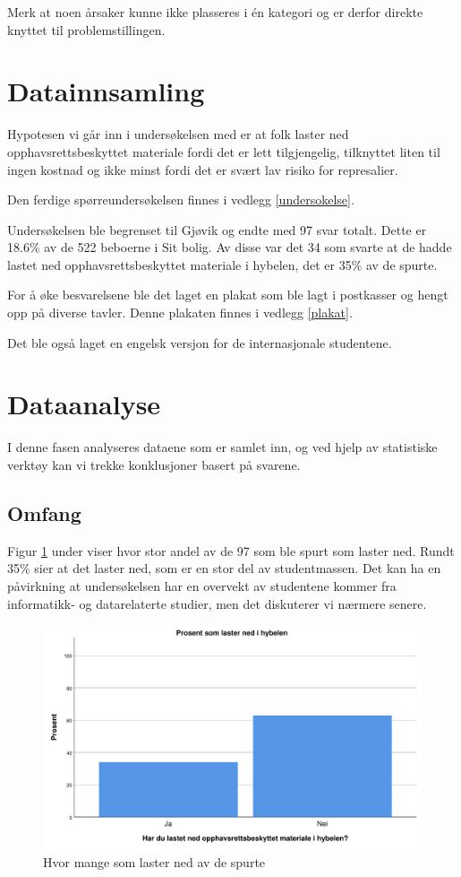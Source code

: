Merk at noen årsaker kunne ikke plasseres i én kategori og er derfor direkte knyttet til problemstillingen.


\section{Datainnsamling}
Hypotesen vi går inn i undersøkelsen med er at folk laster ned opphavsrettsbeskyttet materiale fordi det er lett tilgjengelig, tilknyttet liten til ingen kostnad og ikke minst fordi det er svært lav risiko for represalier. 

Den ferdige spørreundersøkelsen finnes i vedlegg \ref{undersokelse}. 

Undersøkelsen ble begrenset til Gjøvik og endte med 97 svar totalt. Dette er 18.6\% av de 522 beboerne i Sit bolig. Av disse var det 34 som svarte at de hadde lastet ned opphavsrettsbeskyttet materiale i hybelen, det er 35\% av de spurte. 

For å øke besvarelsene ble det laget en plakat som ble lagt i postkasser og hengt opp på diverse tavler. Denne plakaten finnes i vedlegg \ref{plakat}.

Det ble også laget en engelsk versjon for de internasjonale studentene. 

\section{Dataanalyse}
I denne fasen analyseres dataene som er samlet inn, og ved hjelp av statistiske verktøy kan vi trekke konklusjoner basert på svarene. 

\subsection{Omfang}
Figur \ref{fig:case1-lasterned} under viser hvor stor andel av de 97 som ble spurt som laster ned. Rundt 35\% sier at det laster ned, som er en stor del av studentmassen. Det kan ha en påvirkning at undersøkelsen har en overvekt av studentene kommer fra informatikk- og datarelaterte studier, men det diskuterer vi nærmere senere. 

\begin{figure}[H]
    \centering
    \includegraphics[scale=0.45]{case_1/bilder/lasterned.pdf}
    \caption[Hvor mange som laster ned]{Hvor mange som laster ned av de spurte}
    \label{fig:case1-lasterned}
\end{figure}

